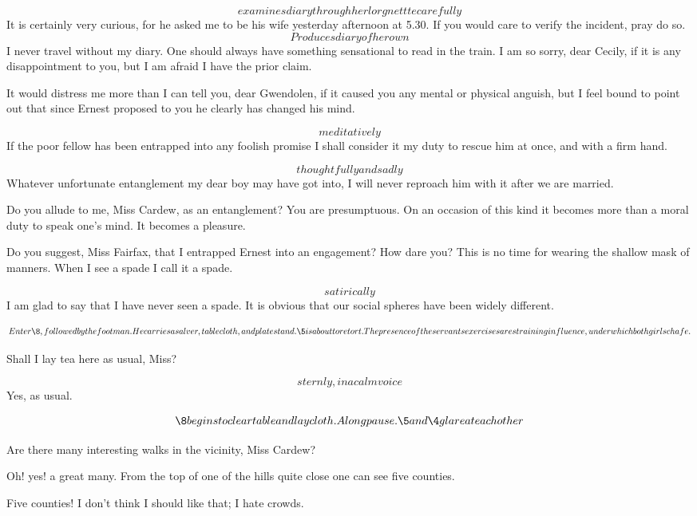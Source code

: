 \documentclass{book}
\begin{document}
\4  \[examines diary through her lorgnettte carefully\]  It
is certainly very curious, for he asked me to be his wife yesterday
afternoon at 5.30.  If you would care to verify the incident, pray
do so.  \[Produces diary of her own\]  I never travel without my
diary.  One should always have something sensational to read in the
train.  I am so sorry, dear Cecily, if it is any disappointment to
you, but I am afraid I have the prior claim.

\5  It would distress me more than I can tell you, dear
Gwendolen, if it caused you any mental or physical anguish, but I
feel bound to point out that since Ernest proposed to you he
clearly has changed his mind.

\4  \[meditatively\]  If the poor fellow has been entrapped
into any foolish promise I shall consider it my duty to rescue him
at once, and with a firm hand.

\5  \[thoughtfully and sadly\]  Whatever unfortunate
entanglement my dear boy may have got into, I will never reproach
him with it after we are married.

\4  Do you allude to me, Miss Cardew, as an entanglement?
You are presumptuous.  On an occasion of this kind it becomes more
than a moral duty to speak one's mind.  It becomes a pleasure.

\5  Do you suggest, Miss Fairfax, that I entrapped Ernest into
an engagement?  How dare you?  This is no time for wearing the
shallow mask of manners.  When I see a spade I call it a spade.

\4  \[satirically\]  I am glad to say that I have never seen
a spade.  It is obvious that our social spheres have been widely
different.

\[Enter \8, followed by the footman.  He carries a salver,
table cloth, and plate stand.  \5 is about to retort.  The
presence of the servants exercises a restraining influence, under
which both girls chafe.\]

\8  Shall I lay tea here as usual, Miss?

\5  \[sternly, in a calm voice\]  Yes, as usual.

\[\8 begins to clear table and lay cloth.  A long pause.  \5 and
\4 glare at each other\]


\4  \DriveOut* Are there many interesting walks in the vicinity, Miss
Cardew? 

\5  Oh! yes! a great many.  From the top of one of the hills
quite close one can see five counties.

\4  Five counties!  I don't think I should like that; I
hate crowds.
\end{document}
